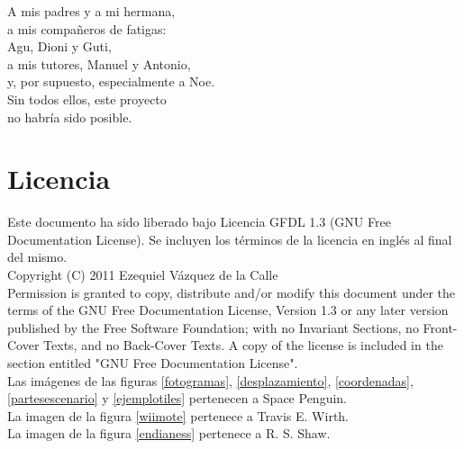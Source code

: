 



\begin{flushright}
A mis padres y a mi hermana,\\
a mis compañeros de fatigas:\\
Agu, Dioni y Guti,\\
a mis tutores, Manuel y Antonio,\\
y, por supuesto, especialmente a Noe.\\
Sin todos ellos, este proyecto\\
no habría sido posible.
\end{flushright}

\cleardoublepage

\section*{Licencia}

Este documento ha sido liberado bajo Licencia GFDL 1.3 (GNU Free Documentation License). Se incluyen los términos de la licencia en inglés al final del mismo.\\

Copyright (C) 2011 Ezequiel Vázquez de la Calle\\

Permission is granted to copy, distribute and/or modify this document under the terms of the GNU Free Documentation License, Version 1.3 or any later version published by the Free Software Foundation; with no Invariant Sections, no Front-Cover Texts, and no Back-Cover Texts. A copy of the license is included in the section entitled "GNU Free Documentation License".\\

Las imágenes de las figuras \ref{fotogramas}, \ref{desplazamiento}, \ref{coordenadas}, \ref{partesescenario} y \ref{ejemplotiles} pertenecen a Space Penguin.\\

La imagen de la figura \ref{wiimote} pertenece a Travis E. Wirth.\\

La imagen de la figura \ref{endianess} pertenece a R. S. Shaw.

